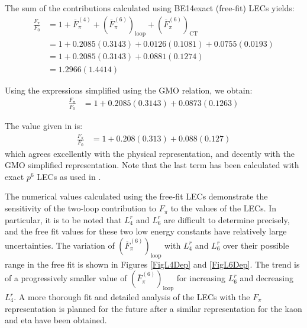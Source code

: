 \documentclass[12pt,a4paper]{article}
\begin{document}
The sum of the contributions calculated using BE14exact (free-fit) LECs yields:
\begin{align}
	\frac{F_{\pi}}{F_0} & = 1 + \overline{F}^{(4)}_{\pi} + \left( \overline{F}^{(6)}_{\pi} \right)_{\text{loop}} + \left( \overline{F}^{(6)}_{\pi} \right)_{\text{CT}} \nonumber\\
	& = 1 + 0.2085(0.3143) + 0.0126(0.1081) + 0.0755(0.0193) \nonumber \\
	& = 1 + 0.2085(0.3143) + 0.0881(0.1274) \nonumber \\
	& = 1.2966(1.4414)
\end{align}

Using the expressions simplified using the GMO relation, we obtain:
\begin{align}
	\frac{F_{\pi}}{F_0} & = 1 + 0.2085(0.3143) + 0.0873(0.1263)
\end{align}

The value given in \cite{Bijnens:2014lea} is:
\begin{align}
	\frac{F_{\pi}}{F_0} & = 1 + 0.208(0.313) + 0.088(0.127)
\end{align}
which agrees excellently with the physical representation, and decently with the GMO simplified representation. Note that the last term has been calculated with exact $p^6$ LECs as used in \cite{Bijnens:2014lea}.

The numerical values calculated using the free-fit LECs demonstrate the sensitivity of the two-loop contribution to $F_{\pi}$ to the values of the LECs. In particular, it is to be noted that $L_4^r$ and $L_6^r$ are difficult to determine precisely, and the free fit values for these two low energy constants have relatively large uncertainties. The variation of $( \overline{F}^{(6)}_{\pi} )_{\text{loop}} $ with $L_4^r$ and $L_6^r$ over their possible range in the free fit is shown in Figures \ref{FigL4Dep} and \ref{FigL6Dep}. The trend is of a progressively smaller value of $( \overline{F}^{(6)}_{\pi} )_{\text{loop}}$ for increasing $L_6^r$ and decreasing $L_4^r$. A more thorough fit and detailed analysis of the LECs with the $F_{\pi}$ representation is planned for the future after a similar representation for the kaon and eta have been obtained.
\end{document}
